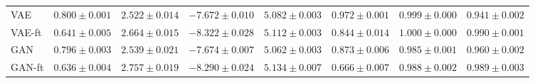 \begin{table}[htbp]
\begin{tabular}{lccccccc}
\midrule
VAE & $0.800 \pm 0.001$ & $2.522 \pm 0.014$ & $-7.672 \pm 0.010$ & $5.082 \pm 0.003$ & $\mathbf{0.972 \pm 0.001}$ & $0.999 \pm 0.000$ & $0.941 \pm 0.002$ \\
VAE-ft & $0.641 \pm 0.005$ & $2.664 \pm 0.015$ & $\mathbf{-8.322 \pm 0.028}$ & $5.112 \pm 0.003$ & $0.844 \pm 0.014$ & $\mathbf{1.000 \pm 0.000}$ & $0.990 \pm 0.001$ \\
GAN & $0.796 \pm 0.003$ & $2.539 \pm 0.021$ & $-7.674 \pm 0.007$ & $5.062 \pm 0.003$ & $0.873 \pm 0.006$ & $0.985 \pm 0.001$ & $0.960 \pm 0.002$ \\
GAN-ft & $0.636 \pm 0.004$ & $2.757 \pm 0.019$ & $-8.290 \pm 0.024$ & $5.134 \pm 0.007$ & $0.666 \pm 0.007$ & $0.988 \pm 0.002$ & $0.989 \pm 0.003$ \\
\bottomrule
\end{tabular}
\end{table}
